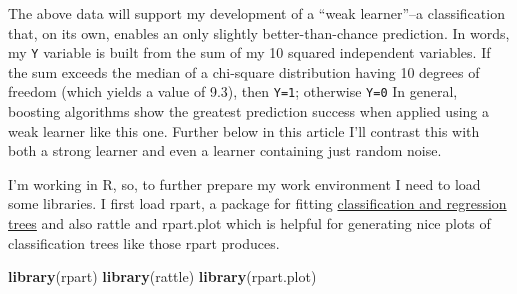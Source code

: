 \documentclass[]{tufte-handout}
\newenvironment{Shaded}{}{}
\newcommand{\KeywordTok}[1]{\textcolor[rgb]{0.00,0.44,0.13}{\textbf{#1}}}
\newcommand{\DataTypeTok}[1]{\textcolor[rgb]{0.56,0.13,0.00}{#1}}
\newcommand{\DecValTok}[1]{\textcolor[rgb]{0.25,0.63,0.44}{#1}}
\newcommand{\FloatTok}[1]{\textcolor[rgb]{0.25,0.63,0.44}{#1}}
\newcommand{\StringTok}[1]{\textcolor[rgb]{0.25,0.44,0.63}{#1}}
\newcommand{\ControlFlowTok}[1]{\textcolor[rgb]{0.00,0.44,0.13}{\textbf{#1}}}
\newcommand{\OperatorTok}[1]{\textcolor[rgb]{0.40,0.40,0.40}{#1}}
\newcommand{\NormalTok}[1]{#1}
\begin{document}
\begin{Shaded}
\end{Shaded}

The above data will support my development of a ``weak learner''--a
classification that, on its own, enables an only slightly
better-than-chance prediction. In words, my \texttt{Y} variable is built
from the sum of my 10 squared independent variables. If the sum exceeds
the median of a chi-square distribution having 10 degrees of freedom
(which yields a value of 9.3), then \texttt{Y=1}; otherwise \texttt{Y=0}
In general, boosting algorithms show the greatest prediction success
when applied using a weak learner like this one. Further below in this
article I'll contrast this with both a strong learner and even a learner
containing just random noise.

I'm working in R, so, to further prepare my work environment I need to
load some libraries. I first load rpart, a package for fitting
\href{https://cran.r-project.org/web/packages/rpart/vignettes/longintro.pdf}{classification
and regression trees} and also rattle and rpart.plot which is helpful
for generating nice plots of classification trees like those rpart
produces.

\begin{Shaded}
\begin{Highlighting}[]
\KeywordTok{library}\NormalTok{(rpart)}
\KeywordTok{library}\NormalTok{(rattle)}
\KeywordTok{library}\NormalTok{(rpart.plot)}
\end{Highlighting}
\end{Shaded}
\end{document}
